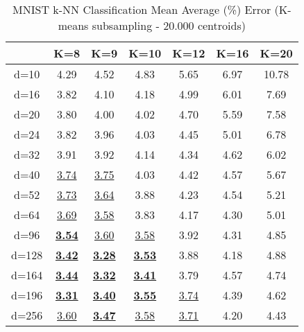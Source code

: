 \begin{table}[H]
\centering
\label{tab:table7}
\begin{tabular}{|c|c|c|c|c|c|c|}
\hline
& K=8 & K=9 & K=10 & K=12 & K=16 & K=20 \\
\hline
d=10 & 4.29 & 4.52 & 4.83 & 5.65 & 6.97 & 10.78 \\
d=16 & 3.82 & 4.10 & 4.18 & 4.99 & 6.01 & 7.69 \\
d=20 & 3.80 & 4.00 & 4.02 & 4.70 & 5.59 & 7.58 \\
d=24 & 3.82 & 3.96 & 4.03 & 4.45 & 5.01 & 6.78 \\
d=32 & 3.91 & 3.92 & 4.14 & 4.34 & 4.62 & 6.02 \\
d=40 & \underline{3.74} & \underline{3.75} & 4.03 & 4.42 & 4.57 & 5.67 \\
d=52 & \underline{3.73} & \underline{3.64} & 3.88 & 4.23 & 4.54 & 5.21 \\
d=64 & \underline{3.69} & \underline{3.58} & 3.83 & 4.17 & 4.30 & 5.01 \\
d=96 & \underline{\textbf{3.54}} & \underline{3.60} & \underline{3.58} & 3.92 & 4.31 & 4.85 \\
d=128 & \underline{\textbf{3.42}} & \underline{\textbf{3.28}} & \underline{\textbf{3.53}} & 3.88 & 4.18 & 4.88 \\
d=164 & \underline{\textbf{3.44}} & \underline{\textbf{3.32}} & \underline{\textbf{3.41}} & 3.79 & 4.57 & 4.74 \\
d=196 & \underline{\textbf{3.31}} & \underline{\textbf{3.40}} & \underline{\textbf{3.55}} & \underline{3.74} & 4.39 & 4.62 \\
d=256 & \underline{3.60} & \underline{\textbf{3.47}} & \underline{3.58} & \underline{3.71} & 4.20 & 4.43 \\
\hline
\end{tabular}
\caption{MNIST k-NN Classification Mean Average (\%) Error (K-means subsampling - 20.000 centroids)}
\end{table}

